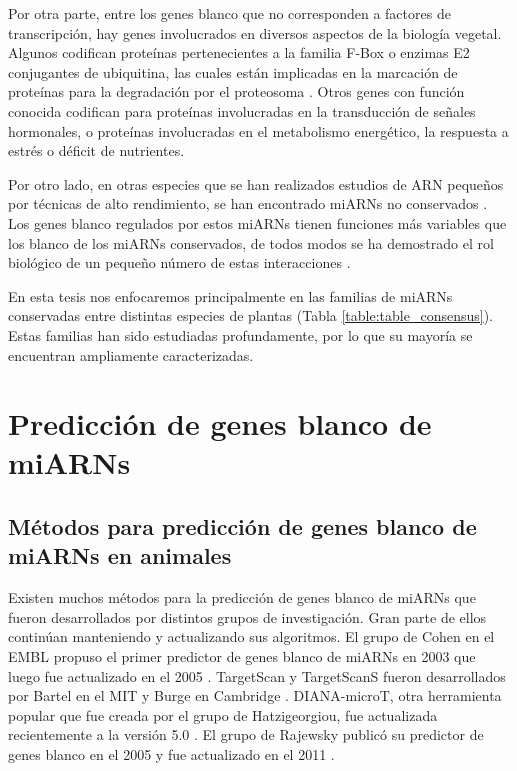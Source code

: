 Por otra parte, entre los genes blanco que no corresponden a factores de transcripción, hay genes involucrados en diversos aspectos de la biología vegetal.
Algunos codifican proteínas pertenecientes a la familia F-Box o enzimas E2 conjugantes de ubiquitina, las cuales están implicadas en la marcación de proteínas para la degradación por el proteosoma \citep{pmid19699140}.
Otros genes con función conocida codifican para proteínas involucradas en la transducción de señales hormonales, o proteínas involucradas en el metabolismo energético, la respuesta a estrés o déficit de nutrientes.

Por otro lado, en otras especies que se han realizados estudios de ARN pequeños por técnicas de alto rendimiento, se han encontrado miARNs no conservados \citep{citeulike:8816489, Rodriguez2010, Rajagopalan2006}.
Los genes blanco regulados por estos miARNs tienen funciones más variables que los blanco de los miARNs conservados, de todos modos se ha demostrado el rol biológico de un pequeño número de estas interacciones \citep{citeulike:8816489}.

En esta tesis nos enfocaremos principalmente en las familias de miARNs conservadas entre distintas especies de plantas (Tabla \ref{table:table_consensus}).
Estas familias han sido estudiadas profundamente, por lo que su mayoría se encuentran ampliamente caracterizadas.


\section{Predicción de genes blanco de miARNs}

\subsection{Métodos para predicción de genes blanco de miARNs en animales}
Existen muchos métodos para la predicción de genes blanco de miARNs que fueron desarrollados por distintos grupos de investigación.
Gran parte de ellos continúan manteniendo y actualizando sus algoritmos. El grupo de Cohen en el EMBL propuso el primer predictor de genes blanco de miARNs en 2003 \citep{pmid14691535} que luego fue actualizado en el 2005 \citep{pmid16337999}.
TargetScan y TargetScanS fueron desarrollados por Bartel en el MIT y Burge en Cambridge \citep{pmid18955434,pmid17612493,pmid14697198,pmid15652477}.
DIANA-microT, otra herramienta popular que fue creada por el grupo de Hatzigeorgiou, fue actualizada recientemente a la versión 5.0 \citep{pmid19765283,pmid21551220,pmid23680784}.
El grupo de Rajewsky publicó su predictor de genes blanco en el 2005 y fue actualizado en el 2011 \citep{pmid15383676,pmid22086949}. 

